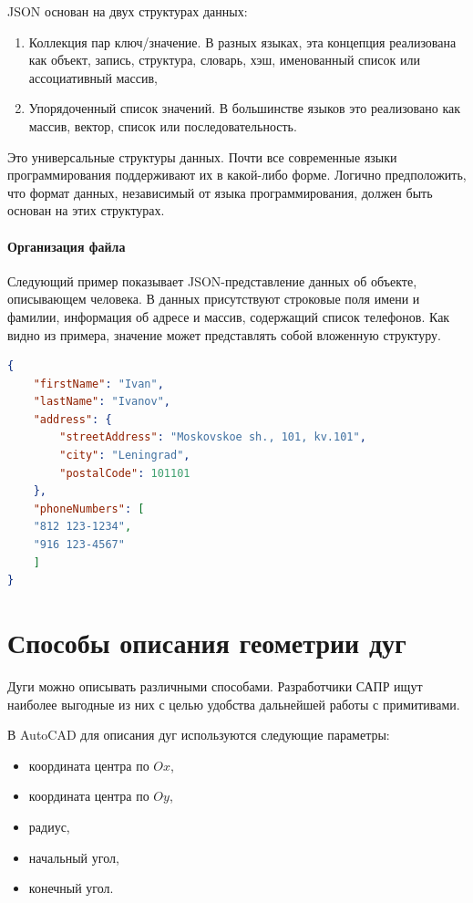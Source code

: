 JSON основан на двух структурах данных:
\begin{enumerate}[1)]
	\item Коллекция пар ключ/значение. В разных языках, эта концепция реализована как объект, запись, структура, словарь, хэш, именованный список или ассоциативный массив, 
	\item Упорядоченный список значений. В большинстве языков это реализовано как массив, вектор, список или последовательность.
\end{enumerate}

Это универсальные структуры данных. Почти все современные языки программирования поддерживают их в какой-либо форме. Логично предположить, что формат данных, независимый от языка программирования, должен быть основан на этих структурах.

\paragraph{Организация файла}

Следующий пример показывает JSON-представление данных об объекте, описывающем человека. В данных присутствуют строковые поля имени и фамилии, информация об адресе и массив, содержащий список телефонов. Как видно из примера, значение может представлять собой вложенную структуру.
\begin{lstlisting}[language=json,label=list:json]
{
	"firstName": "Ivan",
	"lastName": "Ivanov",
	"address": {
		"streetAddress": "Moskovskoe sh., 101, kv.101",
		"city": "Leningrad",
		"postalCode": 101101
	},
	"phoneNumbers": [
	"812 123-1234",
	"916 123-4567"
	]
}
\end{lstlisting}

\section{Способы описания геометрии дуг}

Дуги можно описывать различными способами. Разработчики САПР ищут наиболее выгодные из них с целью удобства дальнейшей работы с примитивами.

В AutoCAD для описания дуг используются следующие параметры:
\begin{itemize}
	\item координата центра по $Ox$,
	\item координата центра по $Oy$,
	\item радиус,
	\item начальный угол,
	\item конечный угол.
\end{itemize}

